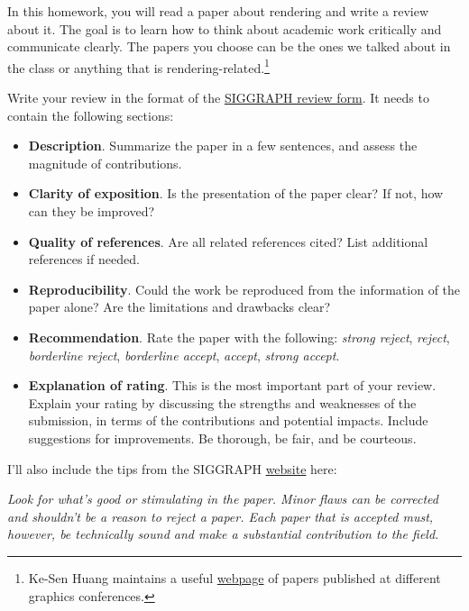 




In this homework, you will read a paper about rendering and write a review about it. The goal is to learn how to think about academic work critically and communicate clearly. The papers you choose can be the ones we talked about in the class or anything that is rendering-related.\footnote{Ke-Sen Huang maintains a useful \href{http://kesen.realtimerendering.com/}{webpage} of papers published at different graphics conferences.}

Write your review in the format of the \href{https://sa2020.siggraph.org/en/submissions/technical-papers/review-form}{SIGGRAPH review form}. It needs to contain the following sections:
\begin{itemize}
	\item \textbf{Description}. Summarize the paper in a few sentences, and assess the magnitude of contributions.
	\item \textbf{Clarity of exposition}. Is the presentation of the paper clear? If not, how can they be improved?
	\item \textbf{Quality of references}. Are all related references cited? List additional references if needed.
	\item \textbf{Reproducibility}. Could the work be reproduced from the information of the paper alone? Are the limitations and drawbacks clear?
	\item \textbf{Recommendation}. Rate the paper with the following: \emph{strong reject}, \emph{reject}, \emph{borderline reject}, \emph{borderline accept}, \emph{accept}, \emph{strong accept}.
	\item \textbf{Explanation of rating}. This is the most important part of your review. Explain your rating by discussing the strengths and weaknesses of the submission, in terms of the contributions and potential impacts. Include suggestions for improvements. Be thorough, be fair, and be courteous.
\end{itemize}



I'll also include the tips from the SIGGRAPH \href{https://sa2020.siggraph.org/en/submissions/technical-papers/reviewer-instructions}{website} here:

\textit{Look for what's good or stimulating in the paper. Minor flaws can be corrected and shouldn't be a reason to reject a paper. Each paper that is accepted must, however, be technically sound and make a substantial contribution to the field.}

